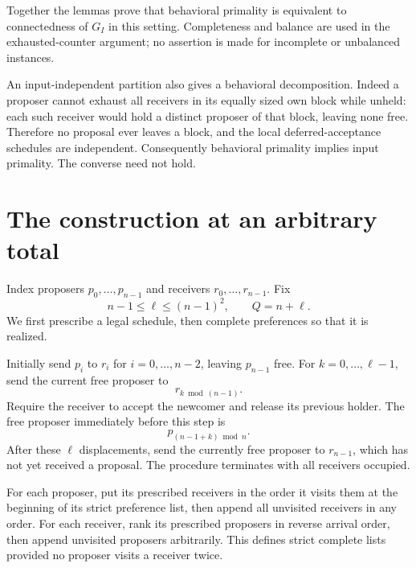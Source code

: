 \documentclass[11pt,a4paper]{article}
\begin{document}
Together the lemmas prove that behavioral primality is equivalent to connectedness of $G_I$ in this setting. Completeness and balance are used in the exhausted-counter argument; no assertion is made for incomplete or unbalanced instances.

An input-independent partition also gives a behavioral decomposition. Indeed a proposer cannot exhaust all receivers in its equally sized own block while unheld: each such receiver would hold a distinct proposer of that block, leaving none free. Therefore no proposal ever leaves a block, and the local deferred-acceptance schedules are independent. Consequently behavioral primality implies input primality. The converse need not hold.

\section{The construction at an arbitrary total}
Index proposers $p_0,\ldots,p_{n-1}$ and receivers $r_0,\ldots,r_{n-1}$. Fix
\[
 n-1\le\ell\le(n-1)^2,
 \qquad Q=n+\ell.                                        \tag{1}
\]
We first prescribe a legal schedule, then complete preferences so that it is realized.

Initially send $p_i$ to $r_i$ for $i=0,\ldots,n-2$, leaving $p_{n-1}$ free. For $k=0,\ldots,\ell-1$, send the current free proposer to
\[
 r_{k\bmod(n-1)}.
\]
Require the receiver to accept the newcomer and release its previous holder. The free proposer immediately before this step is
\[
 p_{(n-1+k)\bmod n}.                                    \tag{2}
\]
After these $\ell$ displacements, send the currently free proposer to $r_{n-1}$, which has not yet received a proposal. The procedure terminates with all receivers occupied.

For each proposer, put its prescribed receivers in the order it visits them at the beginning of its strict preference list, then append all unvisited receivers in any order. For each receiver, rank its prescribed proposers in reverse arrival order, then append unvisited proposers arbitrarily. This defines strict complete lists provided no proposer visits a receiver twice.
\end{document}
